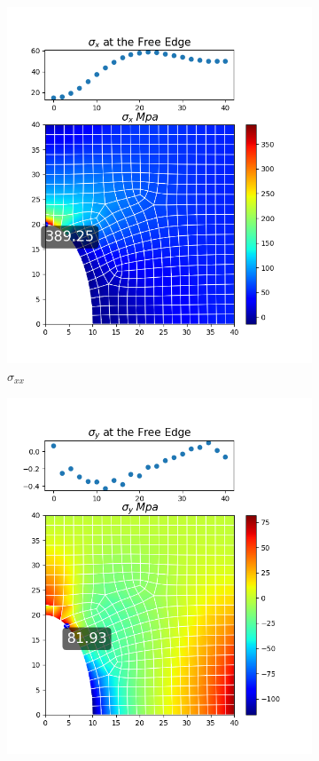 \documentclass[twoside,twocolumn,10pt]{article}
\begin{document}
\begin{figure}[!ht]
  \begin{subfigure}[c]{0.26\textwidth}
    \includegraphics[width=1.\linewidth]{Q2_5/Q5_0.5_x_quad.png}
    \caption{$\sigma_{xx}$}
    \label{fig:x_quad_0.5}
  \end{subfigure}%
  \begin{subfigure}[c]{0.26\textwidth}
    \includegraphics[width=1.\linewidth]{Q2_5/Q5_0.5_y_quad.png}

\end{subfigure}
\end{figure}
\end{document}
